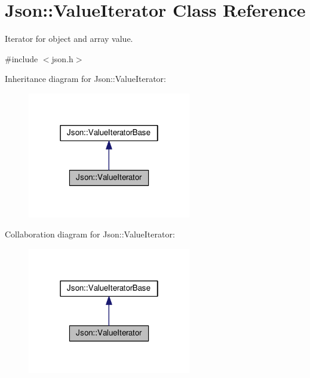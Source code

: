 \hypertarget{class_json_1_1_value_iterator}{}\section{Json\+:\+:Value\+Iterator Class Reference}
\label{class_json_1_1_value_iterator}


Iterator for object and array value.  




{\ttfamily \#include $<$json.\+h$>$}



Inheritance diagram for Json\+:\+:Value\+Iterator\+:
\nopagebreak
\begin{figure}[H]
\begin{center}
\leavevmode
\includegraphics[width=202pt]{class_json_1_1_value_iterator__inherit__graph}
\end{center}
\end{figure}


Collaboration diagram for Json\+:\+:Value\+Iterator\+:
\nopagebreak
\begin{figure}[H]
\begin{center}
\leavevmode
\includegraphics[width=202pt]{class_json_1_1_value_iterator__coll__graph}
\end{center}
\end{figure}

